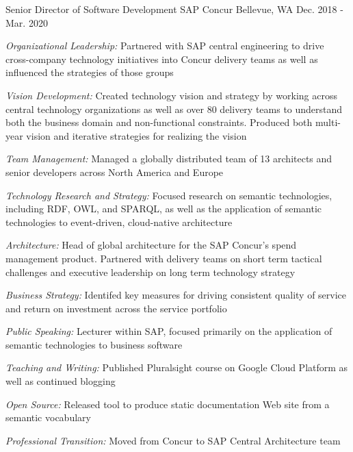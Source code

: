 \begin{cventries}

\cventry
{Senior Director of Software Development} %
{SAP Concur} %
{Bellevue, WA} %
{Dec. 2018 - Mar. 2020} %
{ %
\begin{cvitems}
\item {\emph{Organizational Leadership:} Partnered with SAP central engineering to drive cross-company technology initiatives into Concur delivery teams as well as influenced the strategies of those groups }
\item {\emph{Vision Development:} Created technology vision and strategy by working across central technology organizations as well as over 80 delivery teams to understand both the business domain and non-functional constraints. Produced both multi-year vision and iterative strategies for realizing the vision }
\item {\emph{Team Management:} Managed a globally distributed team of 13 architects and senior developers across North America and Europe }
\item {\emph{Technology Research and Strategy:} Focused research on semantic technologies, including RDF, OWL, and SPARQL, as well as the application of semantic technologies to event-driven, cloud-native architecture }
\item {\emph{Architecture:} Head of global architecture for the SAP Concur’s spend management product. Partnered with delivery teams on short term tactical challenges and executive leadership on long term technology strategy }
\item {\emph{Business Strategy:} Identifed key measures for driving consistent quality of service and return on investment across the service portfolio }
\item {\emph{Public Speaking:} Lecturer within SAP, focused primarily on the application of semantic technologies to business software }
\item {\emph{Teaching and Writing:} Published Pluralsight course on Google Cloud Platform as well as continued blogging }
\item {\emph{Open Source:} Released tool to produce static documentation Web site from a semantic vocabulary }
\item {\emph{Professional Transition:} Moved from Concur to SAP Central Architecture team }
\end{cvitems}
}



\end{cventries}
